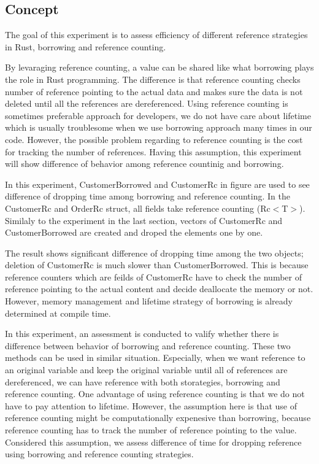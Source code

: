 \subsection{Concept}
The goal of this experiment is to assess efficiency of different reference strategies in Rust, borrowing and reference counting. 

By levaraging reference counting, a value can be shared like what borrowing plays the role in Rust programming. 
The difference is that reference counting checks number of reference pointing to the actual data and makes sure the data is not deleted 
until all the references are dereferenced. Using reference counting is sometimes preferable approach for developers, 
we do not have care about lifetime which is usually troublesome when we use borrowing approach many times in our code. 
However, the possible problem regarding to reference counting is the cost for tracking the number of references. 
Having this assumption, this experiment will show difference of behavior among reference countinig and borrowing.

In this experiment, CustomerBorrowed and CustomerRc in figure are used to see difference of dropping time among borrowing and reference counting. 
In the CustomerRc and OrderRc struct, all fields take reference counting (Rc$<$T$>$). Similaly to the experiment in the last section, 
vectors of CustomerRc and CustomerBorrowed are created and droped the elements one by one. 

The result shows significant difference of dropping time among the two objects; deletion of CustomerRc is much slower than CustomerBorrowed. 
This is because reference counters which are feilds of CustomerRc have to check the number of reference pointing to the actual content and decide 
deallocate the memory or not. However, memory management and lifetime strategy of borrowing is already determined at compile time.


In this experiment, an assessment is conducted to valify whether there is difference between behavior of borrowing and reference counting. 
These two methods can be used in similar situation. Especially, when we want reference to an original variable and keep the original variable until all of references are dereferenced, 
we can have reference with both storategies, borrowing and reference counting. One advantage of using reference counting is that we do not have to pay attention to lifetime.
However, the assumption here is that use of reference counting might be computationally expenesive than borrowing, because reference counting has to track the number of reference pointing to the value. 
Considered this assumption, we assess difference of time for dropping reference using borrowing and reference counting strategies. 

